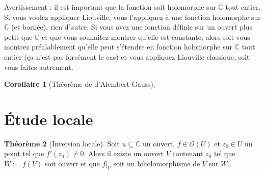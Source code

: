 \documentclass[11pt,a4paper]{book}
\newcommand{\C}{\mathbb{C}}
\theoremstyle{definition}
\newtheorem{theoreme}{Th\'eor\`eme}[section]
\newtheorem{corollaire}[theoreme]{Corollaire}
\theoremstyle{plain}
\begin{document}
 Avertissement : il est important que la fonction soit holomorphe sur $\C$ tout entier. 
 Si vous voulez appliquer Liouville, vous l'appliquez à une fonction holomorphe sur $\C$ (et bornée), rien d'autre.  
Si vous avez une fonction définie sur un ouvert plus petit que $\C$ et que vous souhaitez montrer qu'elle est constante, alors soit vous montrez préalablement qu'elle peut s'étendre en fonction holomorphe sur $\C$ tout entier (ça n'est pas forcément le cas) et vous appliquez Liouville classique, soit vous faites autrement.


 
\begin{corollaire}[Théorème de d'Alembert-Gauss]
\end{corollaire} 
 



\section{Étude locale}

\begin{theoreme}[Inversion locale]
Soit $u\subseteq \C$ un ouvert, $f\in \mathcal O(U)$ et $z_0\in U$ un point tel que $f'(z_0)\neq 0$.
Alors il existe un ouvert $V$ contenant $z_0$ tel que $W:=f(V)$ soit ouvert et que $f|_V$ soit un biholomorphisme de $V$ sur $W$.
\end{theoreme}

\end{document}
